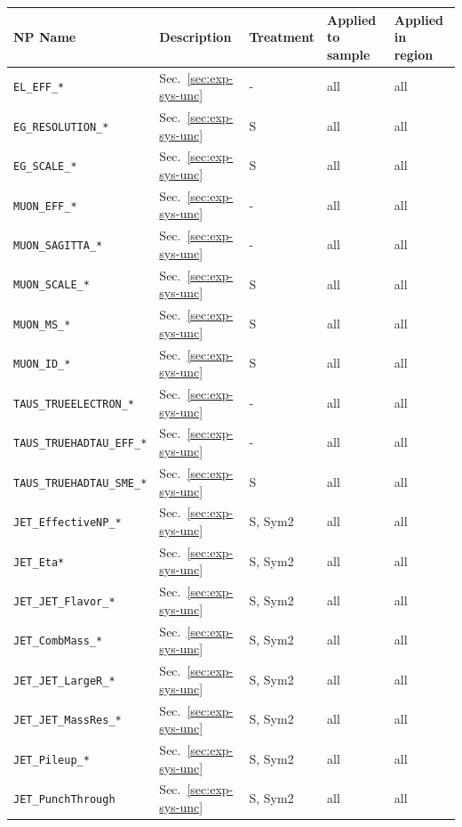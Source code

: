 \begin{table}[H]
    \centering
    \scriptsize
    \begin{tabular}{|p{3.5cm}|p{2.0cm}|p{1.5cm}|p{2cm}|p{1.5cm}|}
        \hline
        NP Name & Description & Treatment & Applied to sample & Applied in region \\
        \hline
        \texttt{EL\_EFF\_*} & Sec.~\ref{sec:exp-sys-unc} & - & all & all \\
        \texttt{EG\_RESOLUTION\_*} & Sec.~\ref{sec:exp-sys-unc} & S & all & all \\
        \texttt{EG\_SCALE\_*} & Sec.~\ref{sec:exp-sys-unc} & S & all & all \\
        \texttt{MUON\_EFF\_*} & Sec.~\ref{sec:exp-sys-unc} & - & all & all \\
        \texttt{MUON\_SAGITTA\_*} & Sec.~\ref{sec:exp-sys-unc} & - & all & all \\
        \texttt{MUON\_SCALE\_*} & Sec.~\ref{sec:exp-sys-unc} & S & all & all \\
        \texttt{MUON\_MS\_*} & Sec.~\ref{sec:exp-sys-unc} & S & all & all \\
        \texttt{MUON\_ID\_*} & Sec.~\ref{sec:exp-sys-unc} & S & all & all \\
        \texttt{TAUS\_TRUEELECTRON\_*} & Sec.~\ref{sec:exp-sys-unc} & - & all & all \\
        \texttt{TAUS\_TRUEHADTAU\_EFF\_*} & Sec.~\ref{sec:exp-sys-unc} & - & all & all \\
        \texttt{TAUS\_TRUEHADTAU\_SME\_*} & Sec.~\ref{sec:exp-sys-unc} & S & all & all \\
        \texttt{JET\_EffectiveNP\_*} & Sec.~\ref{sec:exp-sys-unc} & S, Sym2 & all & all \\
        \texttt{JET\_Eta*} & Sec.~\ref{sec:exp-sys-unc} & S, Sym2 & all & all \\
        \texttt{JET\_JET\_Flavor\_*} & Sec.~\ref{sec:exp-sys-unc} & S, Sym2 & all & all \\
        \texttt{JET\_CombMass\_*} & Sec.~\ref{sec:exp-sys-unc} & S, Sym2 & all & all \\
        \texttt{JET\_JET\_LargeR\_*} & Sec.~\ref{sec:exp-sys-unc} & S, Sym2 & all & all \\
        \texttt{JET\_JET\_MassRes\_*} & Sec.~\ref{sec:exp-sys-unc} & S, Sym2 & all & all \\
        \texttt{JET\_Pileup\_*} & Sec.~\ref{sec:exp-sys-unc} & S, Sym2 & all & all \\
        \texttt{JET\_PunchThrough} & Sec.~\ref{sec:exp-sys-unc} & S, Sym2 & all & all \\

\end{tabular}
\end{table}
